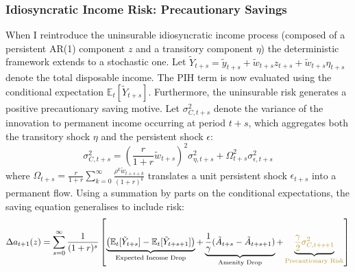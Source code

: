 \documentclass[11pt, a4paper]{article}
\begin{document}
\subsubsection*{Idiosyncratic Income Risk: Precautionary Savings}
When I reintroduce the uninsurable idiosyncratic income process (composed of a persistent AR(1) component $z$ and a transitory component $\eta$) the deterministic framework extends to a stochastic one. Let $\tilde{Y}_{t+s} = \tilde{y}_{t+s} + \tilde{w}_{t+s} z_{t+s} + \tilde{w}_{t+s} \eta_{t+s}$ denote the total disposable income. The PIH term is now evaluated using the conditional expectation $\mathbb{E}_t[\tilde{Y}_{t+s}]$. Furthermore, the uninsurable risk generates a positive precautionary saving motive. Let $\sigma_{C, t+s}^2$ denote the variance of the innovation to permanent income occurring at period $t+s$, which aggregates both the transitory shock $\eta$ and the persistent shock $\epsilon$:
\begin{equation}
    \sigma_{C, t+s}^2 = \left( \frac{r}{1+r} \tilde{w}_{t+s} \right)^2 \sigma_{\eta, t+s}^2 + \Omega_{t+s}^2 \sigma_{\epsilon, t+s}^2
    \label{eq:var_innovation}
\end{equation}
where $\Omega_{t+s} = \frac{r}{1+r} \sum_{k=0}^{\infty} \frac{\rho^k \tilde{w}_{t+s+k}}{(1+r)^k}$ translates a unit persistent shock $\epsilon_{t+s}$ into a permanent flow.
Using a summation by parts on the conditional expectations, the saving equation generalises to include risk:
\begin{equation}
    \Delta a_{t+1}(z) = \sum_{s=0}^{\infty} \frac{1}{(1+r)^s} \left[ \underbrace{\left(\mathbb{E}_t[\tilde{Y}_{t+s}] - \mathbb{E}_t[\tilde{Y}_{t+s+1}]\right)}_{\text{Expected Income Drop}} + \underbrace{\frac{1}{\gamma} (\tilde{A}_{t+s} - \tilde{A}_{t+s+1})}_{\text{Amenity Drop}} + \underbrace{\textcolor{mutedgold}{\frac{\gamma}{2} \sigma_{C, t+s+1}^2}}_{\textcolor{mutedgold}{\text{Precautionary Risk}}} \right]
    \label{eq:saving_stochastic}
\end{equation}
\end{document}

